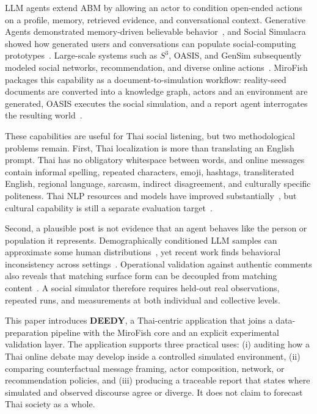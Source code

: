 \documentclass[conference]{IEEEtran}
\begin{document}
LLM agents extend ABM by allowing an actor to condition open-ended actions on
a profile, memory, retrieved evidence, and conversational context. Generative
Agents demonstrated memory-driven believable behavior~\cite{park2023generative},
and Social Simulacra showed how generated users and conversations can populate
social-computing prototypes~\cite{park2022social}. Large-scale systems such as
$S^3$, OASIS, and GenSim subsequently modeled social networks, recommendation,
and diverse online actions~\cite{gao2023s3,yang2024oasis,tang2025gensim}.
MiroFish packages this capability as a document-to-simulation workflow:
reality-seed documents are converted into a knowledge graph, actors and an
environment are generated, OASIS executes the social simulation, and a report
agent interrogates the resulting world~\cite{mirofish2026}.

These capabilities are useful for Thai social listening, but two methodological
problems remain. First, Thai localization is more than translating an English
prompt. Thai has no obligatory whitespace between words, and online messages
contain informal spelling, repeated characters, emoji, hashtags, transliterated
English, regional language, sarcasm, indirect disagreement, and culturally
specific politeness. Thai NLP resources and models have improved
substantially~\cite{arreerard2022survey,phatthiyaphaibun2023pythainlp,
lowphansirikul2021wangchanberta,pipatanakul2024typhoon2}, but cultural capability
is still a separate evaluation target~\cite{kim2025thaicli}.

Second, a plausible post is not evidence that an agent behaves like the person
or population it represents. Demographically conditioned LLM samples can
approximate some human distributions~\cite{argyle2023out}, yet recent work finds
behavioral inconsistency across settings~\cite{mooney2025coherent}. Operational
validation against authentic comments also reveals that matching surface form
can be decoupled from matching content~\cite{schwager2026conditioned}. A social
simulator therefore requires held-out real observations, repeated runs, and
measurements at both individual and collective levels.

This paper introduces \textbf{DEEDY}, a Thai-centric application that joins a
data-preparation pipeline with the MiroFish core and an explicit experimental
validation layer. The application supports three practical uses: (i) auditing
how a Thai online debate may develop inside a controlled simulated environment,
(ii) comparing counterfactual message framing, actor composition, network, or
recommendation policies, and (iii) producing a traceable report that states
where simulated and observed discourse agree or diverge. It does not claim to
forecast Thai society as a whole.
\end{document}
